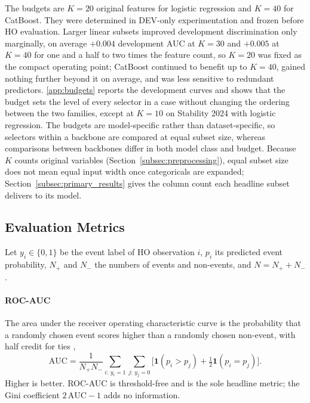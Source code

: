 \documentclass[final,5p,twocolumn]{elsarticle}
\newcommand{\Kfeat}{K}
\newcommand{\AUC}{\mathrm{AUC}}
\begin{document}
The budgets are $\Kfeat=20$ original features for logistic regression and $\Kfeat=40$ for CatBoost. They were determined in DEV-only experimentation and frozen before HO evaluation. Larger linear subsets improved development discrimination only marginally, on average $+0.004$ development AUC at $\Kfeat=30$ and $+0.005$ at $\Kfeat=40$ for one and a half to two times the feature count, so $\Kfeat=20$ was fixed as the compact operating point; CatBoost continued to benefit up to $\Kfeat=40$, gained nothing further beyond it on average, and was less sensitive to redundant predictors. \ref{app:budgets} reports the development curves and shows that the budget sets the level of every selector in a case without changing the ordering between the two families, except at $\Kfeat=10$ on Stability 2024 with logistic regression. The budgets are model-specific rather than dataset-specific, so selectors within a backbone are compared at equal subset size, whereas comparisons between backbones differ in both model class and budget. Because $\Kfeat$ counts original variables (Section~\ref{subsec:preprocessing}), equal subset size does not mean equal input width once categoricals are expanded; Section~\ref{subsec:primary_results} gives the column count each headline subset delivers to its model.

\subsection{Evaluation Metrics}
\label{subsec:metrics}

Let $y_i\in\{0,1\}$ be the event label of HO observation $i$, $p_i$ its predicted event probability, $N_+$ and $N_-$ the numbers of events and non-events, and $N=N_++N_-$.

\paragraph{ROC-AUC}
The area under the receiver operating characteristic curve is the probability that a randomly chosen event scores higher than a randomly chosen non-event, with half credit for ties \cite{hanley1982},
\begin{equation}
    \AUC=\frac{1}{N_+N_-}\sum_{i:\,y_i=1}\sum_{j:\,y_j=0}\big[\mathbf{1}(p_i>p_j)+\tfrac12\mathbf{1}(p_i=p_j)\big].
    \label{eq:roc_auc}
\end{equation}
Higher is better. ROC-AUC is threshold-free and is the sole headline metric; the Gini coefficient $2\,\AUC-1$ adds no information.
\end{document}
